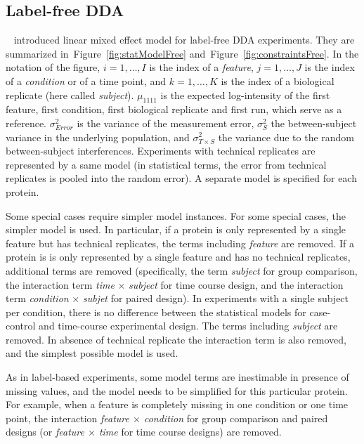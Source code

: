\documentclass[11pt]{article}
\def\figref#1{Figure~\ref{fig:#1}}
\begin{document}
 
\clearpage
\subsection{Label-free DDA \label{sec:model-DDA}}

~\cite{Clough:2012bc} introduced linear mixed effect model for label-free DDA experiments. They are summarized in~\figref{statModelFree} and~\figref{constraintsFree}. In the notation of the figure, $i=1,\ldots,I$ is the index of a {\it feature}, $j=1,\ldots,J$ is the index of a {\it condition} or of a time point, and $k=1,\ldots,K$ is the index of a biological replicate (here called {\it subject}). $\mu_{1111}$ is the expected log-intensity of the first feature, first condition, first biological replicate and first run, which serve as a reference. $\sigma^2_{Error}$ is the variance of the measurement error, $\sigma^2_{S}$ the between-subject variance in the underlying population, and $\sigma^2_{T\times S}$ the variance due to the random between-subject interferences. Experiments with technical replicates are represented by a same model (in statistical terms, the error from technical replicates is pooled into the random error). A separate model is specified for each protein. 

Some special cases require simpler model instances. For some special cases, the simpler model is used. In particular, if a protein is only represented by a single feature but has technical replicates, the terms including {\it feature} are removed. If a protein is is only represented by a single feature and has no technical replicates, additional terms are removed (specifically, the term {\it subject} for group comparison, the interaction term {\it time} $\times$ {\it subject} for time course design, and the interaction term {\it condition} $\times$ {\it subjet} for paired design). In experiments with a single subject per condition, there is no difference between the statistical models for case-control and time-course experimental design. The terms including {\it subject} are removed. In absence of technical replicate the interaction term is also removed, and the simplest possible model is used.

As in label-based experiments, some model terms are inestimable in presence of missing values, and the model needs to be simplified for this particular protein. For example, when a feature is completely missing in one condition or one time point, the interaction {\it feature $\times$ condition} for group comparison and paired designs (or {\it feature $\times$ time} for time course designs) are removed.
\end{document}
